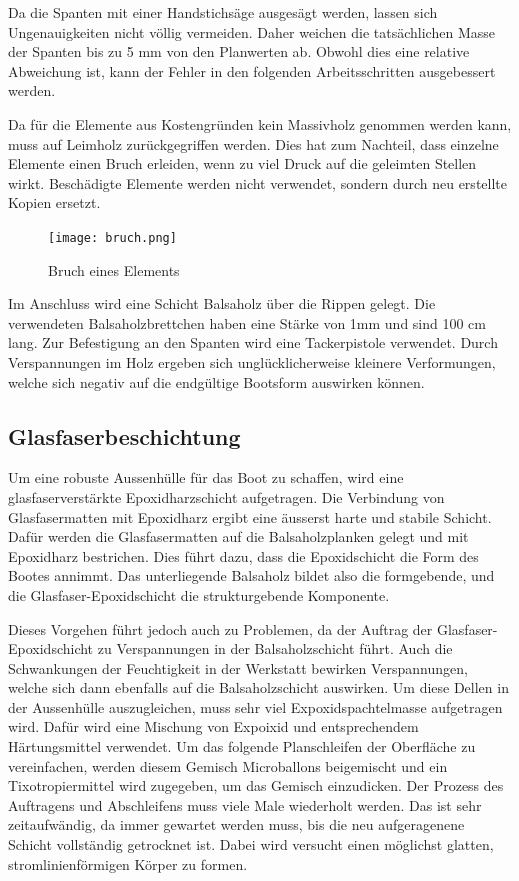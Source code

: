 Da die Spanten  mit einer Handstichsäge ausgesägt werden, lassen sich  Ungenauigkeiten nicht völlig vermeiden. Daher weichen die tatsächlichen Masse der Spanten bis zu 5 mm von den Planwerten ab. Obwohl dies eine relative Abweichung ist, kann der Fehler in den folgenden Arbeitsschritten ausgebessert werden. 

Da für die Elemente aus Kostengründen kein Massivholz genommen werden kann, muss auf Leimholz zurückgegriffen werden. Dies hat zum Nachteil, dass einzelne Elemente einen Bruch erleiden, wenn zu viel Druck auf die geleimten Stellen wirkt. Beschädigte Elemente werden nicht verwendet, sondern durch neu  erstellte Kopien ersetzt. 
\begin{figure}[H]
    \centering
    \texttt{[image: bruch.png]}
    \caption{Bruch eines Elements}
    \label{fig:bruch}
\end{figure}

Im Anschluss wird eine Schicht Balsaholz über die Rippen gelegt. Die verwendeten Balsaholzbrettchen haben eine Stärke von 1mm und sind 100 cm lang. Zur Befestigung an den Spanten wird eine Tackerpistole verwendet. Durch Verspannungen im Holz ergeben sich unglücklicherweise kleinere Verformungen, welche sich negativ auf die endgültige Bootsform auswirken können.

\subsection{Glasfaserbeschichtung}
Um eine robuste  Aussenhülle für das Boot zu schaffen, wird eine glasfaserverstärkte Epoxidharzschicht  aufgetragen. Die Verbindung von Glasfasermatten mit Epoxidharz ergibt eine äusserst harte und stabile Schicht.  Dafür  werden die Glasfasermatten auf die Balsaholzplanken gelegt und mit Epoxidharz bestrichen. Dies führt dazu, dass die Epoxidschicht die Form des Bootes annimmt. Das unterliegende Balsaholz bildet also  die formgebende, und die Glasfaser-Epoxidschicht die  strukturgebende Komponente. 

Dieses Vorgehen führt jedoch auch zu Problemen, da der Auftrag der Glasfaser-Epoxidschicht zu Verspannungen in der Balsaholzschicht führt. Auch die Schwankungen der Feuchtigkeit in der Werkstatt bewirken Verspannungen, welche sich dann ebenfalls auf die Balsaholzschicht auswirken.  Um diese Dellen in der Aussenhülle auszugleichen, muss sehr viel Expoxidspachtelmasse aufgetragen wird. Dafür wird eine Mischung von Expoixid und entsprechendem Härtungsmittel verwendet.  Um das folgende Planschleifen der Oberfläche zu vereinfachen, werden diesem Gemisch Microballons beigemischt und ein Tixotropiermittel wird zugegeben, um das Gemisch einzudicken. Der Prozess des Auftragens und Abschleifens muss  viele Male wiederholt werden. Das ist sehr zeitaufwändig, da immer gewartet werden muss, bis die neu aufgeragenene Schicht vollständig getrocknet ist.  Dabei wird  versucht einen möglichst glatten, stromlinienförmigen Körper zu formen.

